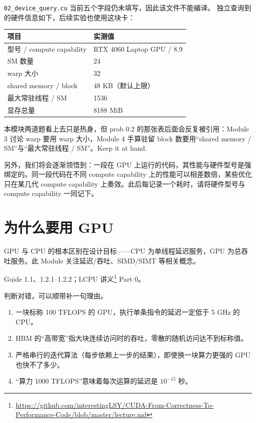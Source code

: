 \documentclass[11pt,a4paper,fontset=fandol]{ctexart}
\begin{document}
\begin{answer}
\texttt{02\_device\_query.cu} 当前五个字段仍未填写，因此该文件不能编译。
独立查询到的硬件信息如下，后续实验也使用这块卡：
\begin{center}\small
\begin{tabular}{@{}ll@{}}
\toprule
项目 & 实测值 \\
\midrule
型号 / compute capability & RTX 4060 Laptop GPU / 8.9 \\
SM 数量 & 24 \\
warp 大小 & 32 \\
shared memory / block & 48 KB（默认上限） \\
最大常驻线程 / SM & 1536 \\
显存总量 & 8188 MiB \\
\bottomrule
\end{tabular}
\end{center}
\end{answer}

\begin{lookback}
本模块两道题看上去只是热身，但 prob 0.2 的那张表后面会反复被引用：Module 3 讨论 warp 要用 warp 大小，Module 4 手算驻留 block 数要用“shared memory / SM”与“最大常驻线程 / SM”。Keep it at hand.

另外，我们将会逐渐领悟到：一段在 GPU 上运行的代码，其性能与硬件型号是强绑定的。同一段代码在不同 compute capability 上的性能可以相差数倍，某些优化只在某几代 compute capability 上奏效。此后每记录一个耗时，请将硬件型号与 compute capability 一同记下。
\end{lookback}

\section{为什么要用 GPU}

GPU 与 CPU 的根本区别在设计目标——CPU 为单线程延迟服务，GPU 为总吞吐服务。此 Module 关注延迟/吞吐、SIMD/SIMT 等相关概念。

\begin{reading}
Guide 1.1、1.2.1--1.2.2；LCPU 讲义\footnote{\url{https://github.com/interestingLSY/CUDA-From-Correctness-To-Performance-Code/blob/master/lecture.md}} Part 0。
\end{reading}

判断对错，可以顺带补一句理由。
\begin{enumerate}[label=(\alph*)]
  \item 一块标称 100 TFLOPS 的 GPU，执行单条指令的延迟一定低于 5 GHz 的 CPU。
  \item HBM 的“高带宽”指大块连续访问时的吞吐，零散的随机访问达不到标称值。
  \item 严格串行的迭代算法（每步依赖上一步的结果），即使换一块算力更强的 GPU 也快不了多少。
  \item “算力 1000 TFLOPS”意味着每次运算的延迟是 $10^{-15}$ 秒。
\end{enumerate}
\end{document}
